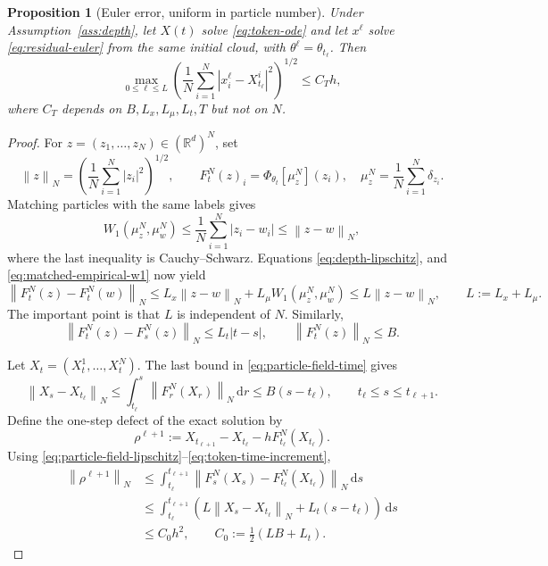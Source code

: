 \documentclass[11pt]{amsart}
\numberwithin{equation}{section}
\theoremstyle{plain}
\newtheorem{proposition}[theorem]{Proposition}
\newcommand{\R}{\mathbb{R}}
\newcommand{\dd}{\,\mathrm{d}}
\newcommand{\abs}[1]{\left\lvert#1\right\rvert}
\newcommand{\norm}[1]{\left\lVert#1\right\rVert}
\begin{document}
\begin{proposition}[Euler error, uniform in particle number]\label{prop:euler}
Under Assumption~\ref{ass:depth}, let $X(t)$ solve \eqref{eq:token-ode} and let
$x^\ell$ solve \eqref{eq:residual-euler} from the same initial cloud, with
$\theta^\ell=\theta_{t_\ell}$.  Then
\begin{equation}\label{eq:euler-error}
 \max_{0\leq\ell\leq L}
 \left(\frac1N\sum_{i=1}^N
 \abs{x_i^\ell-X_{t_\ell}^i}^2\right)^{1/2}
 \leq C_T h,
\end{equation}
where $C_T$ depends on $B,L_x,L_\mu,L_t,T$ but not on $N$.
\end{proposition}
\begin{proof}
For $z=(z_1,\ldots,z_N)\in(\R^d)^N$, set
\[
 \norm{z}_N=\left(\frac1N\sum_{i=1}^N\abs{z_i}^2\right)^{1/2},
 \qquad
 F_t^N(z)_i=\Phi_{\theta_t}[\mu_z^N](z_i),
 \quad
 \mu_z^N=\frac1N\sum_{i=1}^N\delta_{z_i}.
\]
Matching particles with the same labels gives
\begin{equation}\label{eq:matched-empirical-w1}
 W_1(\mu_z^N,\mu_w^N)
 \leq\frac1N\sum_{i=1}^N\abs{z_i-w_i}
 \leq\norm{z-w}_N,
\end{equation}
where the last inequality is Cauchy--Schwarz. Equations \eqref{eq:depth-lipschitz}, and \eqref{eq:matched-empirical-w1} now yield
\begin{equation}\label{eq:particle-field-lipschitz}
 \norm{F_t^N(z)-F_t^N(w)}_N
 \leq L_x\norm{z-w}_N+L_\mu W_1(\mu_z^N,\mu_w^N)
 \leq L\norm{z-w}_N,
 \qquad L:=L_x+L_\mu.
\end{equation}
The important point is that $L$ is independent of $N$.  Similarly,
\begin{equation}\label{eq:particle-field-time}
 \norm{F_t^N(z)-F_s^N(z)}_N\leq L_t\abs{t-s},
 \qquad \norm{F_t^N(z)}_N\leq B.
\end{equation}

Let $X_t=(X_t^1,\ldots,X_t^N)$.  The last bound in
\eqref{eq:particle-field-time} gives
\begin{equation}\label{eq:token-time-increment}
 \norm{X_s-X_{t_\ell}}_N
 \leq\int_{t_\ell}^s\norm{F_r^N(X_r)}_N\dd r
 \leq B(s-t_\ell),
 \qquad t_\ell\leq s\leq t_{\ell+1}.
\end{equation}
Define the one-step defect of the exact solution by
\[
 \rho^{\ell+1}
 :=X_{t_{\ell+1}}-X_{t_\ell}-hF_{t_\ell}^N(X_{t_\ell}).
\]
Using \eqref{eq:particle-field-lipschitz}--\eqref{eq:token-time-increment},
\begin{align*}
 \norm{\rho^{\ell+1}}_N
 &\leq\int_{t_\ell}^{t_{\ell+1}}
 \norm{F_s^N(X_s)-F_{t_\ell}^N(X_{t_\ell})}_N\dd s\\
 &\leq\int_{t_\ell}^{t_{\ell+1}}
 \left(L\norm{X_s-X_{t_\ell}}_N+L_t(s-t_\ell)\right)\dd s\\
 &\leq C_0h^2,
 \qquad C_0:=\frac12(LB+L_t).
\end{align*}


\end{proof}
\end{document}
